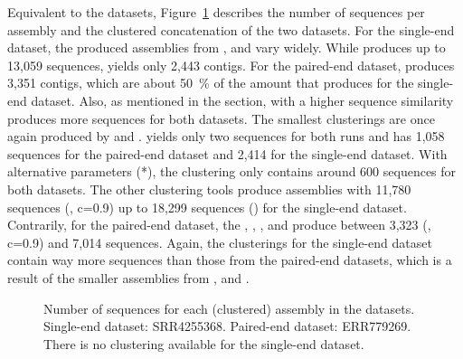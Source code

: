 \documentclass[12pt,a4paper,english]{article}
\begin{document}
    Equivalent to the \celegans datasets, Figure~\ref{img:barcharts:ecos} describes the number of sequences per assembly and the clustered concatenation of the two \ecoli datasets.
	For the single-end dataset, the produced assemblies from \spades, \trinity and \soap vary widely. While \soap produces up to 13,059 sequences, \trinity yields only 2,443 contigs. For the paired-end dataset, \spades produces 3,351 contigs, which are about 50~\% of the amount that \spades produces for the single-end dataset.
	Also, as mentioned in the \celegans section, \cdhit with a higher sequence similarity produces more sequences for both \ecoli datasets. The smallest clusterings are once again produced by \grouper and \karma. \grouper yields only two sequences for both runs and \karma has 1,058 sequences for the paired-end dataset and 2,414 for the single-end dataset. With alternative parameters (\karma{}*), the clustering only contains around 600 sequences for both datasets.
	The other clustering tools produce assemblies with 11,780 sequences (\cdhit, c=0.9) up to 18,299 sequences (\mclusttwo) for the single-end dataset.
	Contrarily, for the paired-end dataset, the \orp, \cdhit, \linclust, \mclust and \mclusttwo produce between 3,323 (\cdhit, c=0.9) and  7,014 sequences.
	Again, the clusterings for the single-end dataset contain way more sequences than those from the paired-end datasets, which is a result of the smaller assemblies from \spades, \soap and \trinity.
	\begin{figure}[H]
	\centering
	\def\svgwidth{\textwidth}
	
	\caption[Number of sequences for each (clustered) assembly in the \ecoli datasets.]{Number of sequences for each (clustered) assembly in the \ecoli datasets. Single-end dataset: SRR4255368. Paired-end dataset: ERR779269. There is no \orp clustering available for the single-end dataset.}
	\label{img:barcharts:ecos}
\end{figure}
	
\end{document}

